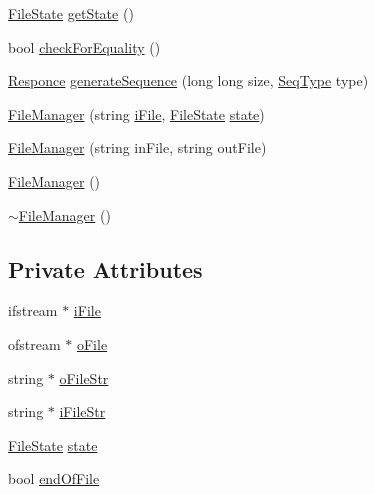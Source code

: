 \begin{DoxyCompactItemize}
\hyperlink{_structures_8h_a57306ae0f9e356347388234ed69e0ce7}{File\+State} \hyperlink{class_file_manager_abd4cbc2b218ab1828ae376a4a9137057}{get\+State} ()
\item 
bool \hyperlink{class_file_manager_ab490a5a5882d33781dcb6d1d42945d97}{check\+For\+Equality} ()
\item 
\hyperlink{_structures_8h_a9864d6ef28dd6e38416afac4426b3491}{Responce} \hyperlink{class_file_manager_a654c8bf606626cd419f5828839cb21a1}{generate\+Sequence} (long long size, \hyperlink{_structures_8h_a76639e910448c3333d0f4d204e53c2c1}{Seq\+Type} type)
\item 
\hyperlink{class_file_manager_a62d69473c95f8df25e44d2466bb00dc5}{File\+Manager} (string \hyperlink{class_file_manager_a91fd33cbb230ed4974a678302e906a8d}{i\+File}, \hyperlink{_structures_8h_a57306ae0f9e356347388234ed69e0ce7}{File\+State} \hyperlink{class_file_manager_a84bbcd4e3807e076ecdbd0e5dfbefa5f}{state})
\item 
\hyperlink{class_file_manager_a2456e56bdcb617c3ee75521cf9dd7057}{File\+Manager} (string in\+File, string out\+File)
\item 
\hyperlink{class_file_manager_a8afd512c06be9daf140cc19d71f9b391}{File\+Manager} ()
\item 
\hyperlink{class_file_manager_abaed33b5b0c13b8a597db9335a1aacfa}{$\sim$\+File\+Manager} ()
\end{DoxyCompactItemize}
\subsection*{Private Attributes}
\begin{DoxyCompactItemize}
\item 
ifstream $\ast$ \hyperlink{class_file_manager_a91fd33cbb230ed4974a678302e906a8d}{i\+File}
\item 
ofstream $\ast$ \hyperlink{class_file_manager_afe31c07e311212814e4a8ba01c7436a1}{o\+File}
\item 
string $\ast$ \hyperlink{class_file_manager_adf10708d6e8e3b4d329077af4666e147}{o\+File\+Str}
\item 
string $\ast$ \hyperlink{class_file_manager_aaa0e6feed45b6a92ce5c0b509bd9ceb6}{i\+File\+Str}
\item 
\hyperlink{_structures_8h_a57306ae0f9e356347388234ed69e0ce7}{File\+State} \hyperlink{class_file_manager_a84bbcd4e3807e076ecdbd0e5dfbefa5f}{state}
\item 
bool \hyperlink{class_file_manager_ae43001594f1ee182581741d2530620a8}{end\+Of\+File}
\end{DoxyCompactItemize}



